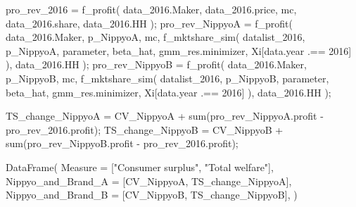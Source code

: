 \documentclass[
  letterpaper,
  DIV=11,
  numbers=noendperiod]{scrreprt}
\newenvironment{Shaded}{\begin{snugshade}}{\end{snugshade}}
\newcommand{\FloatTok}[1]{\textcolor[rgb]{0.68,0.00,0.00}{#1}}
\newcommand{\FunctionTok}[1]{\textcolor[rgb]{0.28,0.35,0.67}{#1}}
\newcommand{\NormalTok}[1]{\textcolor[rgb]{0.00,0.23,0.31}{#1}}
\newcommand{\OperatorTok}[1]{\textcolor[rgb]{0.37,0.37,0.37}{#1}}
\newcommand{\StringTok}[1]{\textcolor[rgb]{0.13,0.47,0.30}{#1}}
\begin{document}
\begin{Shaded}
\begin{Highlighting}[]
\NormalTok{pro\_rev\_2016 }\OperatorTok{=} \FunctionTok{f\_profit}\NormalTok{(}
\NormalTok{    data\_2016.Maker,}
\NormalTok{    data\_2016.price,}
\NormalTok{    mc,}
\NormalTok{    data\_2016.share,}
\NormalTok{    data\_2016.HH}
\NormalTok{);}
\NormalTok{pro\_rev\_NippyoA }\OperatorTok{=} \FunctionTok{f\_profit}\NormalTok{(}
\NormalTok{    data\_2016.Maker,}
\NormalTok{    p\_NippyoA,}
\NormalTok{    mc,}
    \FunctionTok{f\_mktshare\_sim}\NormalTok{(}
\NormalTok{                datalist\_2016,}
\NormalTok{                p\_NippyoA,}
\NormalTok{                parameter,}
\NormalTok{                beta\_hat,}
\NormalTok{                gmm\_res.minimizer,}
\NormalTok{                Xi[data.year }\OperatorTok{.==} \FloatTok{2016}\NormalTok{]}
\NormalTok{            ),}
\NormalTok{    data\_2016.HH}
\NormalTok{);}
\NormalTok{pro\_rev\_NippyoB }\OperatorTok{=} \FunctionTok{f\_profit}\NormalTok{(}
\NormalTok{    data\_2016.Maker,}
\NormalTok{    p\_NippyoB,}
\NormalTok{    mc,}
    \FunctionTok{f\_mktshare\_sim}\NormalTok{(}
\NormalTok{                datalist\_2016,}
\NormalTok{                p\_NippyoB,}
\NormalTok{                parameter,}
\NormalTok{                beta\_hat,}
\NormalTok{                gmm\_res.minimizer,}
\NormalTok{                Xi[data.year }\OperatorTok{.==} \FloatTok{2016}\NormalTok{]}
\NormalTok{            ),}
\NormalTok{    data\_2016.HH}
\NormalTok{);}

\NormalTok{TS\_change\_NippyoA }\OperatorTok{=}\NormalTok{ CV\_NippyoA }\OperatorTok{+} \FunctionTok{sum}\NormalTok{(pro\_rev\_NippyoA.profit }\OperatorTok{{-}}\NormalTok{ pro\_rev\_2016.profit);}
\NormalTok{TS\_change\_NippyoB }\OperatorTok{=}\NormalTok{ CV\_NippyoB }\OperatorTok{+} \FunctionTok{sum}\NormalTok{(pro\_rev\_NippyoB.profit }\OperatorTok{{-}}\NormalTok{ pro\_rev\_2016.profit);}
\end{Highlighting}
\end{Shaded}

\begin{Shaded}
\begin{Highlighting}[]
\FunctionTok{DataFrame}\NormalTok{(}
\NormalTok{    Measure }\OperatorTok{=}\NormalTok{ [}\StringTok{"Consumer surplus"}\NormalTok{, }\StringTok{"Total welfare"}\NormalTok{],}
\NormalTok{    Nippyo\_and\_Brand\_A }\OperatorTok{=}\NormalTok{ [CV\_NippyoA, TS\_change\_NippyoA],}
\NormalTok{    Nippyo\_and\_Brand\_B }\OperatorTok{=}\NormalTok{ [CV\_NippyoB, TS\_change\_NippyoB],}
\NormalTok{)}
\end{Highlighting}
\end{Shaded}
\end{document}
